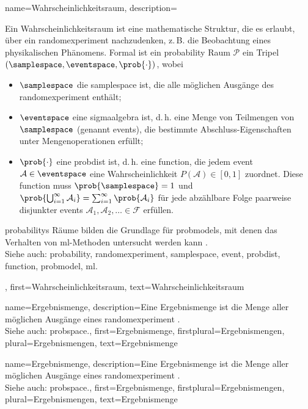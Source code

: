 {{{{
{name={Wahrscheinlichkeitsraum}, 
description={Ein Wahrscheinlichkeitsraum ist eine mathematische Struktur, die es erlaubt, über ein \gls{randomexperiment} nachzudenken, z.\,B. die Beobachtung eines physikalischen Phänomens. 
Formal ist ein \gls{probability} Raum $\mathcal{P}$ ein Tripel $(\samplespace, \eventspace, \prob{\cdot})$, wobei
\begin{itemize}
    \item $\samplespace$ die \gls{samplespace} ist, die alle möglichen Ausgänge des \gls{randomexperiment} enthält;
    \item $\eventspace$ eine \gls{sigmaalgebra} ist, d.\,h. eine Menge von Teilmengen von $\samplespace$ (genannt \glspl{event}), die bestimmte Abschluss-Eigenschaften unter Mengenoperationen erfüllt;
    \item $\prob{\cdot}$ eine \gls{probdist} ist, d.\,h. eine \gls{function}, die jedem \gls{event} $\mathcal{A} \in \eventspace$ eine Wahrscheinlichkeit $P(\mathcal{A}) \in [0,1]$ zuordnet. Diese \gls{function} muss $\prob{\samplespace} = 1$ und $\prob{\bigcup_{i=1}^{\infty} \mathcal{A}_i} = \sum_{i=1}^{\infty} \prob{\mathcal{A}_i}$ für jede abzählbare Folge paarweise disjunkter \glspl{event} $\mathcal{A}_1, \mathcal{A}_2, \ldots \in \mathcal{F}$ erfüllen.
\end{itemize}
\glspl{probability} Räume bilden die Grundlage für \glspl{probmodel}, mit denen das Verhalten von \gls{ml}-Methoden untersucht werden kann \cite{BillingsleyProbMeasure, GrayProbBook, ross2013first}.
\\
Siehe auch: \gls{probability}, \gls{randomexperiment}, \gls{samplespace}, \gls{event}, \gls{probdist}, \gls{function}, \gls{probmodel}, \gls{ml}.},
first={Wahrscheinlichkeitsraum}, 
text={Wahrscheinlichkeitsraum}
}

{name={Ergebnismenge}, 
description={Eine Ergebnismenge ist die Menge aller möglichen Ausgänge eines \gls{randomexperiment} \cite{BillingsleyProbMeasure, BertsekasProb, papoulis, AshProbMeasure}.
\\
Siehe auch: \gls{probspace}.},
first={Ergebnismenge}, 
firstplural={Ergebnismengen},
plural={Ergebnismengen},
text={Ergebnismenge}
}

{name={Ergebnismenge}, 
description={Eine Ergebnismenge ist die Menge aller möglichen Ausgänge eines \gls{randomexperiment} \cite{BillingsleyProbMeasure, BertsekasProb, papoulis, AshProbMeasure}.
\\
Siehe auch: \gls{probspace}.},  
first={Ergebnismenge}, 
firstplural={Ergebnismengen},
plural={Ergebnismengen},
text={Ergebnismenge}
}

}}}}

